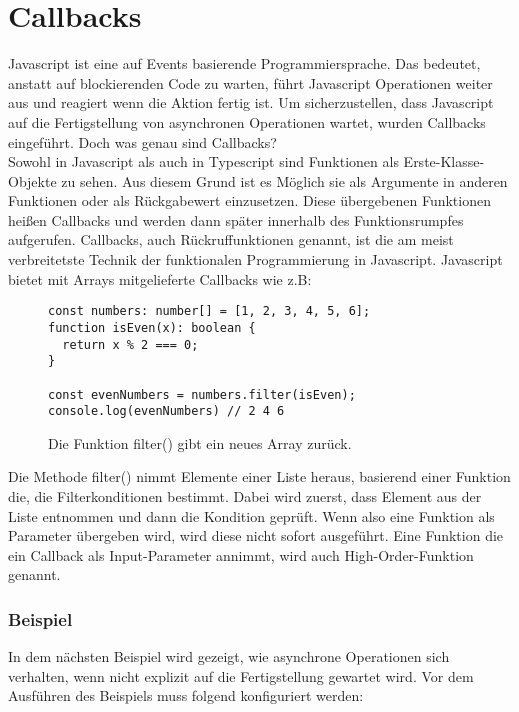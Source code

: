 \section{Callbacks}
Javascript ist eine auf Events basierende Programmiersprache. Das bedeutet, anstatt auf blockierenden Code zu warten, führt Javascript Operationen weiter aus und reagiert wenn die Aktion fertig ist. Um sicherzustellen, dass Javascript auf die Fertigstellung von asynchronen Operationen wartet, wurden Callbacks eingeführt. Doch was genau sind Callbacks? \\

\noindent
Sowohl in Javascript als auch in Typescript sind Funktionen als Erste-Klasse-Objekte zu sehen. Aus diesem Grund ist es Möglich sie als Argumente in anderen Funktionen oder als Rückgabewert einzusetzen. Diese übergebenen Funktionen heißen Callbacks und werden dann \glqq{}später\grqq{} innerhalb des Funktionsrumpfes aufgerufen. Callbacks, auch Rückruffunktionen genannt, ist die am meist verbreitetste Technik der funktionalen Programmierung in Javascript.\cite{callbacks-intro} Javascript bietet mit Arrays mitgelieferte Callbacks wie z.B:

\begin{figure}[H]
\begin{lstlisting}[basicstyle=\small]
const numbers: number[] = [1, 2, 3, 4, 5, 6];
function isEven(x): boolean { 
  return x % 2 === 0; 
}

const evenNumbers = numbers.filter(isEven);
console.log(evenNumbers) // 2 4 6
\end{lstlisting}
\caption{Die Funktion filter() gibt ein neues Array zurück.\cite{callbacks-example}}
\end{figure}

\noindent
Die Methode filter() nimmt Elemente einer Liste heraus, basierend einer Funktion die, die Filterkonditionen bestimmt. Dabei wird zuerst, dass Element aus der Liste entnommen und dann die Kondition geprüft. Wenn also eine Funktion als Parameter übergeben wird, wird diese nicht sofort ausgeführt. Eine Funktion die ein Callback als Input-Parameter annimmt, wird auch High-Order-Funktion genannt.

\subsubsection{Beispiel}

In dem nächsten Beispiel wird gezeigt, wie asynchrone Operationen sich verhalten, wenn nicht explizit auf die Fertigstellung gewartet wird. Vor dem Ausführen des Beispiels muss folgend konfiguriert werden:

